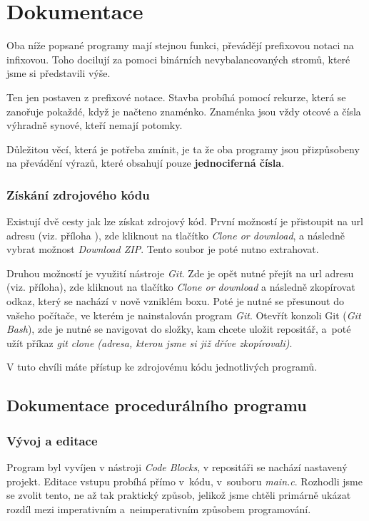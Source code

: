 \documentclass[12pt,a4paper]{report}
\begin{document}
\chapter{Dokumentace}
Oba níže popsané programy mají stejnou funkci, převádějí prefixovou notaci na infixovou. Toho docilují za pomoci binárních nevybalancovaných stromů, které jsme si představili výše.

Ten jen postaven z prefixové notace. Stavba probíhá pomocí rekurze, která se zanořuje pokaždé, když je načteno znaménko. Znaménka jsou vždy otcové a čísla výhradně synové, kteří nemají potomky.

Důležitou věcí, která je potřeba zmínit, je ta že oba programy jsou přizpůsobeny na převádění výrazů, které obsahují pouze \textbf{jednociferná čísla}. 

\subsection*{Získání zdrojového kódu}
Existují dvě cesty jak lze získat zdrojový kód. První možností je přistoupit na url adresu (viz. příloha ), zde kliknout na tlačítko \textit{Clone or download}, a následně vybrat možnost \textit{Download ZIP}. Tento soubor je poté nutno extrahovat. 

Druhou možností je využití nástroje \textit{Git}. Zde je opět nutné přejít na url adresu (viz. příloha), zde kliknout na tlačítko \textit{Clone or download} a následně zkopírovat odkaz, který se nachází v nově vzniklém boxu. Poté je nutné se přesunout do vašeho počítače, ve kterém je nainstalován program \textit{Git}. Otevřít konzoli Git (\textit{Git Bash}), zde je nutné se navigovat do složky, kam chcete uložit repositář, a~poté užít příkaz \textit{git clone (adresa, kterou jsme si již dříve zkopírovali)}.

V tuto chvíli máte přístup ke zdrojovému kódu jednotlivých programů.   

\section{Dokumentace procedurálního programu}

\subsection{Vývoj a editace}
Program byl vyvíjen v nástroji \textit{Code Blocks}, v repositáři se nachází nastavený projekt. Editace vstupu probíhá přímo v~kódu, v~souboru \textit{main.c}. Rozhodli jsme se zvolit tento, ne až tak praktický způsob, jelikož jsme chtěli primárně ukázat rozdíl mezi imperativním a~neimperativním způsobem programování. 
\newpage
\end{document}
